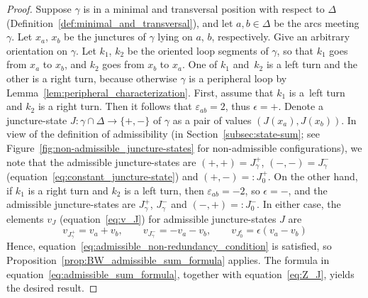 \documentclass[10pt,a4paper]{amsart}
\numberwithin{equation}{section}
\theoremstyle{definition}
\begin{document}
\begin{proof} Suppose $\gamma$ is in a minimal and transversal position with respect to $\Delta$ (Definition~\ref{def:minimal_and_transversal}), and let $a,b\in \Delta$ be the arcs meeting $\gamma$. Let $x_a$, $x_b$ be the junctures of $\gamma$ lying on $a$, $b$, respectively. Give an arbitrary orientation on $\gamma$. Let $k_1$, $k_2$ be the oriented loop segments of $\gamma$, so that $k_1$ goes from $x_a$ to $x_b$, and $k_2$ goes from $x_b$ to $x_a$. One of $k_1$ and~$k_2$ is a left turn and the other is a right turn, because otherwise $\gamma$ is a peripheral loop by Lemma~\ref{lem:peripheral_characterization}. First, assume that $k_1$ is a~left turn and $k_2$ is a right turn. Then it follows that $\varepsilon_{ab} = 2$, thus $\epsilon=+$. Denote a juncture-state $J \colon \gamma \cap \Delta \to \{+,-\}$ of $\gamma$ as a pair of values $(J(x_a),J(x_b))$. In view of the definition of admissibility (in Section~\ref{subsec:state-sum}; see Figure~\ref{fig:non-admissible_juncture-states} for non-admissible configurations), we note that the admissible juncture-states are $(+,+) = J_{\gamma}^+$, $(-,-) = J_{\gamma}^-$ (equation~\eqref{eq:constant_juncture-state}) and $(+,-) =: J_0^+$. On the other hand, if $k_1$ is a right turn and $k_2$ is a left turn, then $\varepsilon_{ab} = -2$, so $\epsilon=-$, and the admissible juncture-states are $J_\gamma^+$, $J_\gamma^-$ and $(-,+) =: J_0^-$. In either case, the elements $v_J$ (equation~\eqref{eq:v_J}) for admissible juncture-states $J$ are
\[
v_{J_\gamma^+} = v_a + v_b, \qquad v_{J_\gamma^-} = -v_a - v_b, \qquad
v_{J_0^\epsilon} = \epsilon(v_a - v_b)
\]
Hence, equation~\eqref{eq:admissible_non-redundancy_condition} is satisfied, so Proposition~\ref{prop:BW_admissible_sum_formula} applies. The formula in equation~\eqref{eq:admissible_sum_formula}, together with equation~\eqref{eq:Z_J}, yields the desired result.
\end{proof}
\end{document}
